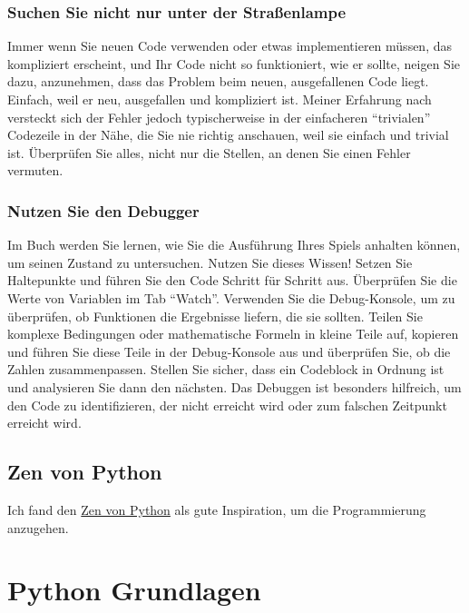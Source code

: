 \documentclass[
]{book}
\begin{document}
\hypertarget{suchen-sie-nicht-nur-unter-der-strauxdfenlampe}{%
\subsection{Suchen Sie nicht nur unter der Straßenlampe}\label{suchen-sie-nicht-nur-unter-der-strauxdfenlampe}}

Immer wenn Sie neuen Code verwenden oder etwas implementieren müssen, das kompliziert erscheint, und Ihr Code nicht so funktioniert, wie er sollte, neigen Sie dazu, anzunehmen, dass das Problem beim neuen, ausgefallenen Code liegt. Einfach, weil er neu, ausgefallen und kompliziert ist. Meiner Erfahrung nach versteckt sich der Fehler jedoch typischerweise in der einfacheren ``trivialen'' Codezeile in der Nähe, die Sie nie richtig anschauen, weil sie einfach und trivial ist. Überprüfen Sie alles, nicht nur die Stellen, an denen Sie einen Fehler vermuten.

\hypertarget{nutzen-sie-den-debugger}{%
\subsection{Nutzen Sie den Debugger}\label{nutzen-sie-den-debugger}}

Im Buch werden Sie lernen, wie Sie die Ausführung Ihres Spiels anhalten können, um seinen Zustand zu untersuchen. Nutzen Sie dieses Wissen! Setzen Sie Haltepunkte und führen Sie den Code Schritt für Schritt aus. Überprüfen Sie die Werte von Variablen im Tab ``Watch''. Verwenden Sie die Debug-Konsole, um zu überprüfen, ob Funktionen die Ergebnisse liefern, die sie sollten. Teilen Sie komplexe Bedingungen oder mathematische Formeln in kleine Teile auf, kopieren und führen Sie diese Teile in der Debug-Konsole aus und überprüfen Sie, ob die Zahlen zusammenpassen. Stellen Sie sicher, dass ein Codeblock in Ordnung ist und analysieren Sie dann den nächsten. Das Debuggen ist besonders hilfreich, um den Code zu identifizieren, der nicht erreicht wird oder zum falschen Zeitpunkt erreicht wird.

\hypertarget{zen-von-python}{%
\section{Zen von Python}\label{zen-von-python}}

Ich fand den \href{https://www.python.org/dev/peps/pep-0020/}{Zen von Python} als gute Inspiration, um die Programmierung anzugehen.

\hypertarget{python-grundlagen}{%
\chapter{Python Grundlagen}\label{python-grundlagen}}
\end{document}
